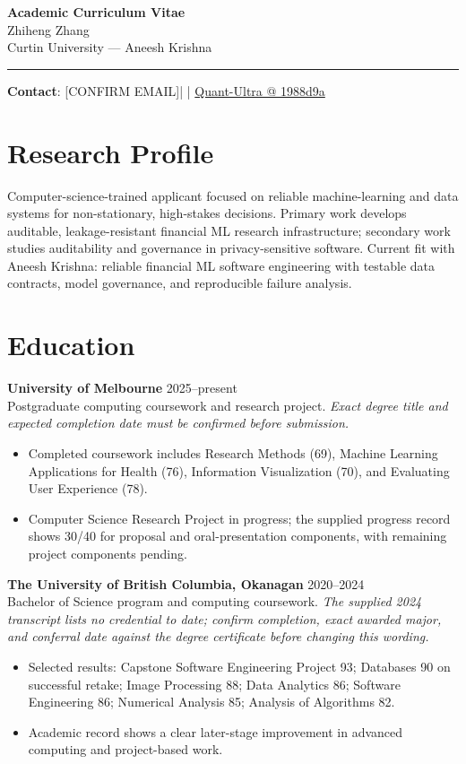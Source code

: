 \documentclass[11pt]{article}
\makeatletter
\newcommand{\ApplicantName}{Zhiheng Zhang}
\newcommand{\ApplicantEmail}{[CONFIRM EMAIL]}
\newcommand{\ApplicantPhone}{[CONFIRM PHONE]}
\newcommand{\ApplicantGitHub}{\href{https://github.com/zhiheng-zhang-Mera/Quant-Ultra/tree/1988d9a8530da91a8158de864d098ea869098923}{Quant-Ultra @ 1988d9a}}
\makeatother
\begin{document}
\begin{center}
{\LARGE\bfseries Academic Curriculum Vitae}\\[0.25em]
{\large \ApplicantName}\\
Curtin University --- Aneesh Krishna
\end{center}
\vspace{0.35em}\hrule\vspace{0.65em}

\textbf{Contact}: \ApplicantEmail\quad | \quad \ApplicantPhone\quad | \quad \ApplicantGitHub

\section*{Research Profile}
Computer-science-trained applicant focused on reliable machine-learning and data systems for non-stationary, high-stakes decisions. Primary work develops auditable, leakage-resistant financial ML research infrastructure; secondary work studies auditability and governance in privacy-sensitive software. Current fit with Aneesh Krishna: reliable financial ML software engineering with testable data contracts, model governance, and reproducible failure analysis.

\section*{Education}
\textbf{University of Melbourne} \hfill 2025--present\\
Postgraduate computing coursework and research project. \textit{Exact degree title and expected completion date must be confirmed before submission.}
\begin{itemize}
\item Completed coursework includes Research Methods (69), Machine Learning Applications for Health (76), Information Visualization (70), and Evaluating User Experience (78).
\item Computer Science Research Project in progress; the supplied progress record shows 30/40 for proposal and oral-presentation components, with remaining project components pending.
\end{itemize}

\textbf{The University of British Columbia, Okanagan} \hfill 2020--2024\\
Bachelor of Science program and computing coursework. \textit{The supplied 2024 transcript lists no credential to date; confirm completion, exact awarded major, and conferral date against the degree certificate before changing this wording.}
\begin{itemize}
\item Selected results: Capstone Software Engineering Project 93; Databases 90 on successful retake; Image Processing 88; Data Analytics 86; Software Engineering 86; Numerical Analysis 85; Analysis of Algorithms 82.
\item Academic record shows a clear later-stage improvement in advanced computing and project-based work.
\end{itemize}
\end{document}
